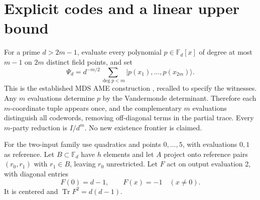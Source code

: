 \documentclass[11pt,a4paper]{article}
\newcommand{\Tr}{\operatorname{Tr}}
\newcommand{\F}{\mathbb F}
\begin{document}
\section{Explicit codes and a linear upper bound}\label{sec:MDS}
For a prime \(d>2m-1\), evaluate every polynomial \(p\in\F_d[x]\) of degree at most \(m-1\) on \(2m\) distinct field points, and set
\begin{equation}\label{eq:MDS}
 \Psi_d=d^{-m/2}\sum_{\deg p<m}|p(x_1),\ldots,p(x_{2m})\rangle.
\end{equation}
This is the established MDS AME construction \cite{MDS}, recalled to specify the witnesses. Any \(m\) evaluations determine \(p\) by the Vandermonde determinant. Therefore each \(m\)-coordinate tuple appears once, and the complementary \(m\) evaluations distinguish all codewords, removing off-diagonal terms in the partial trace. Every \(m\)-party reduction is \(I/d^m\). No new existence frontier is claimed.

For the two-input family use quadratics and points \(0,\ldots,5\), with evaluations \(0,1\) as reference. Let \(B\subset\F_d\) have \(h\) elements and let \(A\) project onto reference pairs \((r_0,r_1)\) with \(r_1\in B\), leaving \(r_0\) unrestricted. Let \(F\) act on output evaluation 2, with diagonal entries
\[
 F(0)=d-1,\qquad F(x)=-1\quad(x\ne0).
\]
It is centered and \(\Tr F^2=d(d-1)\).
\end{document}
